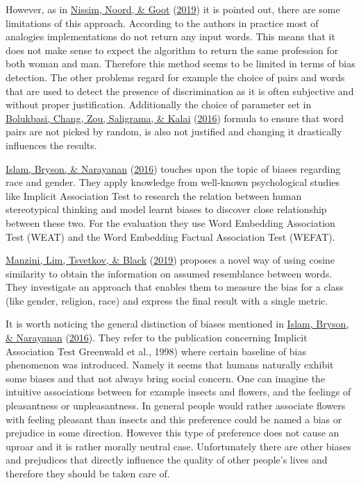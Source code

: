 \documentclass[
  12pt,
]{book}
\begin{document}
However, as in \protect\hyperlink{ref-Nissim2019Fair}{Nissim, Noord, \& Goot} (\protect\hyperlink{ref-Nissim2019Fair}{2019}) it is pointed out, there are some limitations of this approach. According to the authors in practice most of analogies implementations do not return any input words. This means that it does not make sense to expect the algorithm to return the same profession for both woman and man. Therefore this method seems to be limited in terms of bias detection. The other problems regard for example the
choice of pairs and words that are used to detect the presence of discrimination as it is often subjective and without proper justification. Additionally the choice of parameter set in \protect\hyperlink{ref-Bolukbasi2016Man}{Bolukbasi, Chang, Zou, Saligrama, \& Kalai} (\protect\hyperlink{ref-Bolukbasi2016Man}{2016}) formula to ensure that word pairs are not picked by random, is also not justified and changing it drastically
influences the results.

\protect\hyperlink{ref-Caliskan2017Semantics}{Islam, Bryson, \& Narayanan} (\protect\hyperlink{ref-Caliskan2017Semantics}{2016}) touches upon the topic of biases regarding race and gender. They apply knowledge from well-known psychological studies like Implicit Association Test to research the relation between human stereotypical thinking and model learnt biases to
discover close relationship between these two. For the evaluation they use Word Embedding Association Test (WEAT) and the Word Embedding Factual Association Test (WEFAT).

\protect\hyperlink{ref-manzini2019black}{Manzini, Lim, Tsvetkov, \& Black} (\protect\hyperlink{ref-manzini2019black}{2019}) proposes a novel way of using cosine similarity to obtain the information on assumed resemblance between words. They investigate
an approach that enables them to measure the bias for a class (like gender, religion, race) and express the final result with a single metric.

It is worth noticing the general distinction of biases mentioned in \protect\hyperlink{ref-Caliskan2017Semantics}{Islam, Bryson, \& Narayanan} (\protect\hyperlink{ref-Caliskan2017Semantics}{2016}). They refer to the publication concerning Implicit Association
Test Greenwald et al., 1998) where certain baseline of bias phenomenon was introduced. Namely it seems that humans naturally exhibit some biases and
that not always bring social concern. One can imagine the intuitive associations between for example insects and flowers, and the feelings of pleasantness or unpleasantness. In general people would rather associate flowers with feeling pleasant than insects and this preference could be named a bias or
prejudice in some direction. However this type of preference does not cause an uproar and it is rather morally neutral case. Unfortunately there are other
biases and prejudices that directly influence the quality of other people's lives and therefore they should be taken care of.
\end{document}
